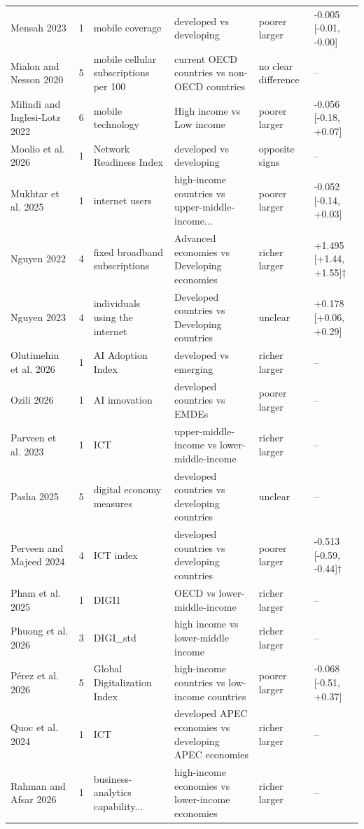 {\begin{longtable}{@{}p{3.0cm} p{0.4cm} p{3.3cm} p{3.7cm} p{1.8cm} p{2.9cm}@{}}
Mensah 2023 & 1 & mobile coverage & developed vs developing & poorer larger & -0.005 [-0.01, -0.00]\\
Mialon and Nesson 2020 & 5 & mobile cellular subscriptions per 100 & current OECD countries vs non-OECD countries & no clear difference & --\\
Milindi and Inglesi-Lotz 2022 & 6 & mobile technology & High income vs Low income & poorer larger & -0.056 [-0.18, +0.07]\\
Moolio et al. 2026 & 1 & Network Readiness Index & developed vs developing & opposite signs & --\\
Mukhtar et al. 2025 & 1 & internet users & high-income countries vs upper-middle-income... & poorer larger & -0.052 [-0.14, +0.03]\\
Nguyen 2022 & 4 & fixed broadband subscriptions & Advanced economies vs Developing economies & richer larger & +1.495 [+1.44, +1.55]$\dagger$\\
Nguyen 2023 & 4 & individuals using the internet & Developed countries vs Developing countries & unclear & +0.178 [+0.06, +0.29]\\
Olutimehin et al. 2026 & 1 & AI Adoption Index & developed vs emerging & richer larger & --\\
Ozili 2026 & 1 & AI innovation & developed countries vs EMDEs & poorer larger & --\\
Parveen et al. 2023 & 1 & ICT & upper-middle-income vs lower-middle-income & richer larger & --\\
Pasha 2025 & 5 & digital economy measures & developed countries vs developing countries & unclear & --\\
Perveen and Majeed 2024 & 4 & ICT index & developed countries vs developing countries & poorer larger & -0.513 [-0.59, -0.44]$\dagger$\\
Pham et al. 2025 & 1 & DIGI1 & OECD vs lower-middle-income & richer larger & --\\
Phuong et al. 2026 & 3 & DIGI\_std & high income vs lower-middle income & richer larger & --\\
Pérez et al. 2026 & 5 & Global Digitalization Index & high-income countries vs low-income countries & poorer larger & -0.068 [-0.51, +0.37]\\
Quoc et al. 2024 & 1 & ICT & developed APEC economies vs developing APEC economies & richer larger & --\\
Rahman and Afsar 2026 & 1 & business-analytics capability... & high-income economies vs lower-income economies & richer larger & --\\

\end{longtable}}
